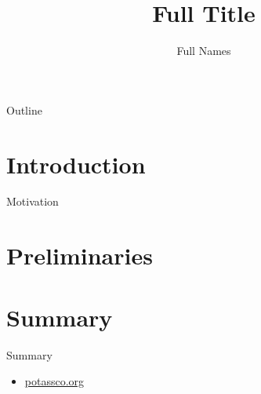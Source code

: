 \documentclass[t]{beamer}
\title[Short Title]{Full Title}
\author[Short Names]{Full Names}
\institute[KRR@UP]{University of Potsdam \&\ Potassco Solutions GmbH \\
  \bigskip
  \pgfuseimage{potasscologo}}
\date{}
\begin{document}
\frame{\titlepage}
\begin{frame}{Outline}
  \bigskip
  \vfill
  \tableofcontents
\end{frame}

\section{Introduction}
\begin{frame}{Motivation}
\end{frame}
\section{Preliminaries}
\begin{frame}{}
\end{frame}
\section{Summary}
\begin{frame}{Summary}
  \begin{itemize}
  \item \url{potassco.org}
  \end{itemize}
\end{frame}

\end{document}
